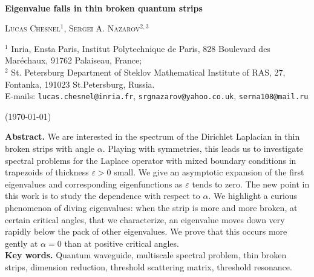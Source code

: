 \documentclass[11pt,a4paper]{article}
\newcommand{\eps}{\varepsilon}
\begin{document}
~\vspace{-0.6cm}
\begin{center}


{\sc \bf\fontsize{20}{20}\selectfont 
Eigenvalue falls in thin broken quantum strips} 
 
\end{center}


\begin{center}
\textsc{Lucas Chesnel}$^1$, \textsc{Sergei A. Nazarov}$^{2,3}$\\[16pt]
\begin{minipage}{0.86\textwidth}
{\small
$^1$ Inria, Ensta Paris, Institut Polytechnique de Paris, 828 Boulevard des Mar\'echaux, 91762 Palaiseau, France;\\
$^2$ St. Petersburg Department of Steklov Mathematical Institute of RAS, 27, Fontanka, 191023 St.Petersburg, Russia.\\
E-mails: \texttt{lucas.chesnel@inria.fr}, \texttt{srgnazarov@yahoo.co.uk}, \texttt{serna108@mail.ru}\\[-14pt]
\begin{center}
(\today)
\end{center}
}
\end{minipage}

\vspace{0.2cm}

\begin{minipage}{0.88\textwidth}
\noindent\textbf{Abstract.} We are interested in the spectrum of the Dirichlet Laplacian in thin broken strips with angle $\alpha$. Playing with symmetries, this leads us to investigate spectral problems for the Laplace operator with mixed boundary conditions in trapezoids of thickness $\eps>0$ small. We give an asymptotic expansion of the first eigenvalues and corresponding eigenfunctions as $\eps$ tends to zero. The new point in this work is to study the dependence with respect to $\alpha$. We highlight a curious phenomenon of diving eigenvalues: when the strip is more and more broken, at certain critical angles, that we characterize, an eigenvalue moves down very rapidly below the pack of other eigenvalues. We prove that this occurs more gently at $\alpha=0$ than at positive critical angles.\\[4pt]
\noindent\textbf{Key words.} Quantum waveguide, multiscale spectral problem, thin broken strips, dimension reduction, threshold scattering matrix, threshold resonance. 
\end{minipage}
\end{center}
\end{document}
